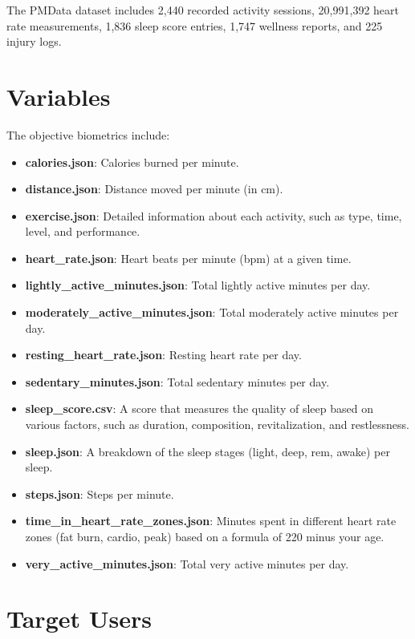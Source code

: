 \documentclass[10pt]{extarticle}
\begin{document}
The PMData dataset includes 2,440 recorded activity sessions, 20,991,392 heart rate measurements, 1,836 sleep score entries, 1,747 wellness reports, and 225 injury logs.

\section{Variables}

The objective biometrics include:

\begin{itemize}
    \item \textbf{calories.json}: Calories burned per minute.
    \item \textbf{distance.json}: Distance moved per minute (in cm).
    \item \textbf{exercise.json}: Detailed information about each activity, such as type, time, level, and performance.
    \item \textbf{heart\_rate.json}: Heart beats per minute (bpm) at a given time.
    \item \textbf{lightly\_active\_minutes.json}: Total lightly active minutes per day.
    \item \textbf{moderately\_active\_minutes.json}: Total moderately active minutes per day.
    \item \textbf{resting\_heart\_rate.json}: Resting heart rate per day.
    \item \textbf{sedentary\_minutes.json}: Total sedentary minutes per day.
    \item \textbf{sleep\_score.csv}: A score that measures the quality of sleep based on various factors, such as duration, composition, revitalization, and restlessness.
    \item \textbf{sleep.json}: A breakdown of the sleep stages (light, deep, rem, awake) per sleep.
    \item \textbf{steps.json}: Steps per minute.
    \item \textbf{time\_in\_heart\_rate\_zones.json}: Minutes spent in different heart rate zones (fat burn, cardio, peak) based on a formula of 220 minus your age.
    \item \textbf{very\_active\_minutes.json}: Total very active minutes per day.
\end{itemize}

\section{Target Users}
\end{document}
